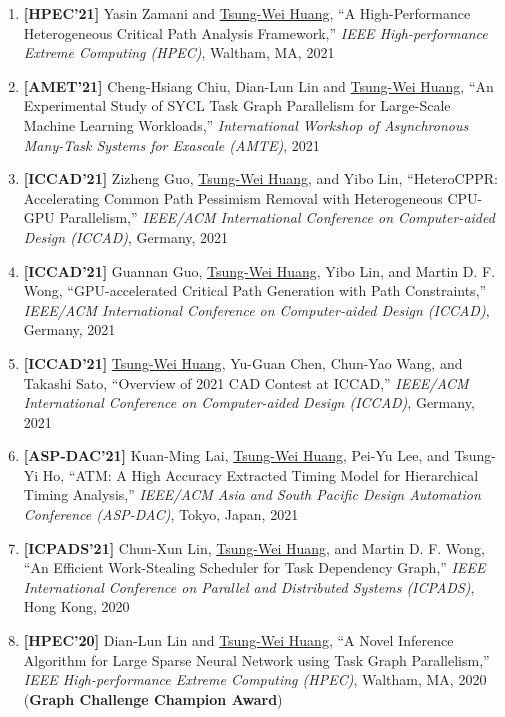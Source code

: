 \documentclass[A4,11pt]{article}
\begin{document}
\begin{enumerate}
    \item \textbf{[HPEC'21]} Yasin Zamani and \underline{Tsung-Wei Huang}, ``A High-Performance Heterogeneous Critical Path Analysis Framework,'' \textit{IEEE High-performance Extreme Computing (HPEC)}, Waltham, MA, 2021
    
    \item \textbf{[AMET'21]} Cheng-Hsiang Chiu, Dian-Lun Lin and \underline{Tsung-Wei Huang}, ``An Experimental Study of SYCL Task Graph Parallelism for Large-Scale Machine Learning Workloads,'' \textit{International Workshop of Asynchronous Many-Task Systems for Exascale (AMTE)}, 2021

    \item \textbf{[ICCAD'21]} Zizheng Guo, \underline{Tsung-Wei Huang}, and Yibo Lin, ``HeteroCPPR: Accelerating Common Path Pessimism Removal with Heterogeneous CPU-GPU Parallelism,'' \textit{IEEE/ACM International Conference on Computer-aided Design (ICCAD)}, Germany, 2021

    \item \textbf{[ICCAD'21]} Guannan Guo, \underline{Tsung-Wei Huang}, Yibo Lin, and Martin D. F. Wong, ``GPU-accelerated Critical Path Generation with Path Constraints,'' \textit{IEEE/ACM International Conference on Computer-aided Design (ICCAD)}, Germany, 2021

    \item \textbf{[ICCAD'21]} \underline{Tsung-Wei Huang}, Yu-Guan Chen, Chun-Yao Wang, and Takashi Sato, ``Overview of 2021 CAD Contest at ICCAD,'' \textit{IEEE/ACM International Conference on Computer-aided Design (ICCAD)}, Germany, 2021

    \item \textbf{[ASP-DAC'21]} Kuan-Ming Lai, \underline{Tsung-Wei Huang}, Pei-Yu Lee, and Tsung-Yi Ho, ``ATM: A High Accuracy Extracted Timing Model for Hierarchical Timing Analysis,'' \textit{IEEE/ACM Asia and South Pacific Design Automation Conference (ASP-DAC)}, Tokyo, Japan, 2021

    \item \textbf{[ICPADS'21]} Chun-Xun Lin, \underline{Tsung-Wei Huang}, and Martin D. F. Wong, ``An Efficient Work-Stealing Scheduler for Task Dependency Graph,'' \textit{IEEE International Conference on Parallel and Distributed Systems (ICPADS)}, Hong Kong, 2020

    \item \textbf{[HPEC'20]} Dian-Lun Lin and \underline{Tsung-Wei Huang}, ``A Novel Inference Algorithm for Large Sparse Neural Network using Task Graph Parallelism,'' \textit{IEEE High-performance Extreme Computing (HPEC)}, Waltham, MA, 2020 (\textbf{Graph Challenge Champion Award})


\end{enumerate}
\end{document}
